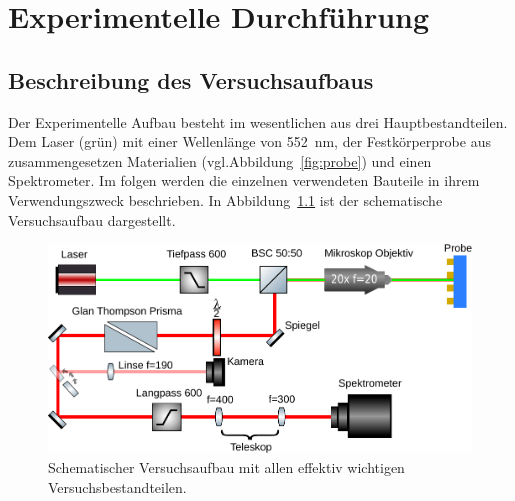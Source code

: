 \chapter{Experimentelle Durchführung}

\section{Beschreibung des Versuchsaufbaus}
\label{sec:Beschreibung des Versuchsaufbaus}
Der Experimentelle Aufbau besteht im wesentlichen aus drei Hauptbestandteilen.
Dem Laser (grün) mit einer Wellenlänge von \SI{552}{\nano\meter}, der Festkörperprobe aus zusammengesetzen
Materialien (vgl.Abbildung~\ref{fig:probe}) und einen Spektrometer.
Im folgen werden die einzelnen verwendeten Bauteile in ihrem Verwendungszweck beschrieben.
In Abbildung~\ref{fig:aufbau} ist der schematische Versuchsaufbau dargestellt.
\begin{figure}
    \centering
    \includegraphics[scale=0.75]{./Plots/setup.pdf}
    \caption{Schematischer Versuchsaufbau mit allen effektiv wichtigen Versuchsbestandteilen.}
    \label{fig:aufbau}
\end{figure}
\FloatBarrier


